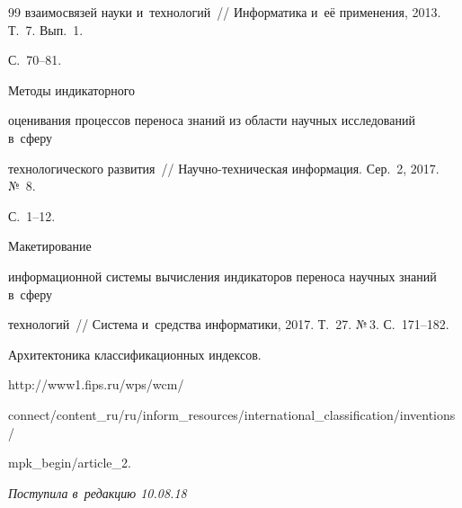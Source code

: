 {{\begin{thebibliography}{99}
взаимосвязей науки и~технологий~/\!\!/ Информатика и~её применения, 2013. Т.~7. Вып.~1. 


С.~70--81.




 Методы индикаторного 


оценивания процессов переноса знаний из области научных исследований в~сферу 


технологического развития~/\!\!/ На\-уч\-но-тех\-ни\-че\-ская информация. Сер.~2, 2017. №~8. 


С.~1--12.




 Макетирование 


информационной системы вычисления индикаторов переноса научных знаний в~сферу 


технологий~/\!\!/ Система и~средства информатики, 2017. Т.~27. №\,3. С.~171--182.




Архитектоника классификационных индексов. 


{\sf http://www1.fips.ru/wps/wcm/\linebreak 


connect/content\_ru/ru/inform\_resources/international\_classification/inventions/\linebreak


mpk\_begin/article\_2.}


        \end{thebibliography}


} }








\vspace*{-3pt}





\hfill{\small\textit{Поступила в~редакцию 10.08.18}}














\vspace*{8pt}





